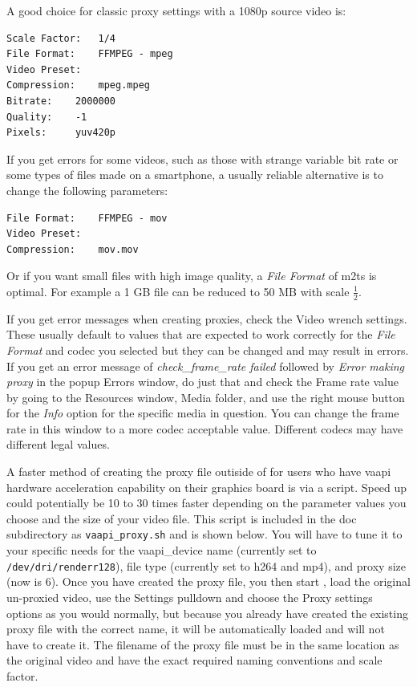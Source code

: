 A good choice for classic proxy settings with a 1080p source video is:

\begin{lstlisting}[numbers=none]
Scale Factor: 	1/4
File Format:	FFMPEG - mpeg
Video Preset:
Compression:	mpeg.mpeg
Bitrate:	2000000
Quality:	-1
Pixels:		yuv420p
\end{lstlisting}

If you get errors for some videos, such as those with strange variable bit rate or some types of files made on a smartphone, a usually reliable alternative is to change the following parameters:

\begin{lstlisting}[numbers=none]
File Format:	FFMPEG - mov
Video Preset:
Compression:	mov.mov
\end{lstlisting}

Or if you want small files with high image quality, a \textit{File Format} of m2ts is optimal.  For example a 1 GB file can be reduced to 50 MB with scale $\frac{1}{2}$. 

If you get error messages  when creating proxies, check the Video wrench settings.  These usually default to values that are expected to work correctly for the \textit{File Format} and codec you selected but they can be changed and may result in errors.  If you get an error message of \textit{check\_frame\_rate failed} followed by \textit{Error making proxy} in the popup Errors window, do just that and check the Frame rate value by going to the Resources window, Media folder, and use the right mouse button for the \textit{Info} option for the specific media in question.  You can change the frame rate in this window to a more codec acceptable value.  Different codecs may have different legal values.

A faster method of creating the proxy file outiside of \CGG{} for users who have
vaapi hardware acceleration capability on their graphics board is via a script.  Speed
up could potentially be 10 to 30 times faster depending on the parameter values you choose
and the size of your video file.  This script is included in the doc subdirectory as 
\texttt{vaapi\_proxy.sh} and is shown below.  You will
have to tune it to your specific needs for the vaapi\_device name (currently set to
\texttt{/dev/dri/renderr128}), file type (currently set to h264 and mp4), and proxy size (now is 6). 
Once you have created the proxy file, you then start \CGG{}, load the original un-proxied
video, use the Settings pulldown and choose the Proxy settings options as you would normally,
but because you already have created the existing proxy file with the correct name, it will
be automatically loaded and will not have to create it.  The filename of the proxy file
must be in the same location as the original video and have the exact required naming
conventions and scale factor.

